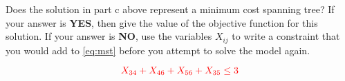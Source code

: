 \begin{parts}
\vfill

 Does the solution in part c above represent a minimum cost spanning tree?  If your answer is \mbox{\bf{YES}}, then give the value of the objective function for this solution.  If your answer is \mbox{\bf{NO}}, use the variables $X_{ij}$ to write a constraint that you would add to \eqref{eq:mst} before you attempt to solve the model again.

\vspace{0.25cm}

\mbox{} 

\vspace{0.5cm}

\mbox{}

\[\textcolor{red}{ X_{34} + X_{46} + X_{56} + X_{35} \leq 3} \]
\vfill


\vfill



\end{parts}








\newpage




